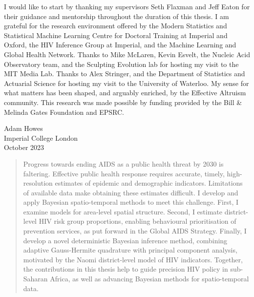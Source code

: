 \documentclass[a4paper, nobind]{templates/ociamthesis}
\begin{document}
\begin{romanpages}
\begin{acknowledgements}
 	I would like to start by thanking my supervisors Seth Flaxman and Jeff Eaton for their guidance and mentorship throughout the duration of this thesis.
 I am grateful for the research environment offered by the Modern Statistics and Statistical Machine Learning Centre for Doctoral Training at Imperial and Oxford, the HIV Inference Group at Imperial, and the Machine Learning and Global Health Network.
 Thanks to Mike McLaren, Kevin Esvelt, the Nucleic Acid Observatory team, and the Sculpting Evolution lab for hosting my visit to the MIT Media Lab.
 Thanks to Alex Stringer, and the Department of Statistics and Actuarial Science for hosting my visit to the University of Waterloo.
 My sense for what matters has been shaped, and arguably enriched, by the Effective Altruism community.
 This research was made possible by funding provided by the Bill \& Melinda Gates Foundation and EPSRC.

 \begin{flushright}
 Adam Howes \\
 Imperial College London\\
 October 2023
 \end{flushright}
\end{acknowledgements}

\begin{abstract}
	Progress towards ending AIDS as a public health threat by 2030 is faltering.
Effective public health response requires accurate, timely, high-resolution estimates of epidemic and demographic indicators.
Limitations of available data make obtaining these estimates difficult.
I develop and apply Bayesian spatio-temporal methods to meet this challenge.
First, I examine models for area-level spatial structure.
Second, I estimate district-level HIV risk group proportions, enabling behavioural prioritisation of prevention services, as put forward in the Global AIDS Strategy.
Finally, I develop a novel deterministic Bayesian inference method, combining adaptive Gauss-Hermite quadrature with principal component analysis, motivated by the Naomi district-level model of HIV indicators.
Together, the contributions in this thesis help to guide precision HIV policy in sub-Saharan Africa, as well as advancing Bayesian methods for spatio-temporal data.
\end{abstract}


\end{romanpages}
\end{document}
